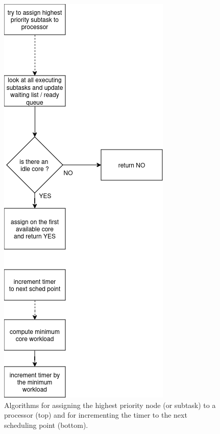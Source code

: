 \begin{figure}
    \centering
    \includegraphics[width=0.8\linewidth]{images/makespan_computation_algorithm_assign.png}
    \caption{Algorithms for assigning the highest priority node (or subtask) to a processor (top)
    and for incrementing the timer to the next scheduling point (bottom).}
    \label{fig:algo_makespan_details}
\end{figure}

